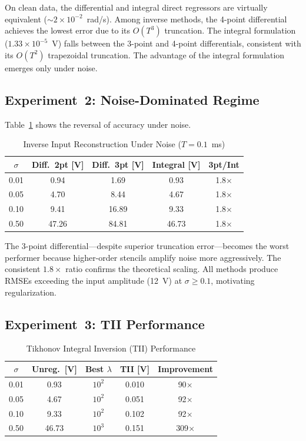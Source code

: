 \documentclass[lettersize,journal]{IEEEtran}
\begin{document}
On clean data, the differential and integral direct regressors are virtually equivalent (${\sim}2{\times}10^{-2}$~rad/s). Among inverse methods, the 4-point differential achieves the lowest error due to its $O(T^3)$ truncation. The integral formulation ($1.33{\times}10^{-5}$~V) falls between the 3-point and 4-point differentials, consistent with its $O(T^2)$ trapezoidal truncation. The advantage of the integral formulation emerges only under noise.

\subsection{Experiment~2: Noise-Dominated Regime}

Table~\ref{tab:noisy_inv} shows the reversal of accuracy under noise.

\begin{table}[!t]
\centering
\caption{Inverse Input Reconstruction Under Noise ($T = 0.1$~ms)}
\label{tab:noisy_inv}
\begin{tabular}{ccccc}
\toprule
$\sigma$ & Diff.\ 2pt [V] & Diff.\ 3pt [V] & Integral [V] & 3pt/Int \\
\midrule
0.01 &  0.94 &  1.69 & 0.93 & 1.8$\times$ \\
0.05 &  4.70 &  8.44 & 4.67 & 1.8$\times$ \\
0.10 &  9.41 & 16.89 & 9.33 & 1.8$\times$ \\
0.50 & 47.26 & 84.81 & 46.73 & 1.8$\times$ \\
\bottomrule
\end{tabular}
\end{table}

The 3-point differential---despite superior truncation error---becomes the worst performer because higher-order stencils amplify noise more aggressively. The consistent $1.8\times$ ratio confirms the theoretical scaling. All methods produce RMSEs exceeding the input amplitude (12~V) at $\sigma \geq 0.1$, motivating regularization.

\subsection{Experiment~3: TII Performance}

\begin{table}[!t]
\centering
\caption{Tikhonov Integral Inversion (TII) Performance}
\label{tab:tii}
\begin{tabular}{ccccc}
\toprule
$\sigma$ & Unreg.\ [V] & Best $\lambda$ & TII [V] & Improvement \\
\midrule
0.01 &  0.93 & $10^{2}$  & 0.010 &  90$\times$ \\
0.05 &  4.67 & $10^{2}$  & 0.051 &  92$\times$ \\
0.10 &  9.33 & $10^{2}$  & 0.102 &  92$\times$ \\
0.50 & 46.73 & $10^{3}$ & 0.151 & 309$\times$ \\
\bottomrule
\end{tabular}
\end{table}
\end{document}
